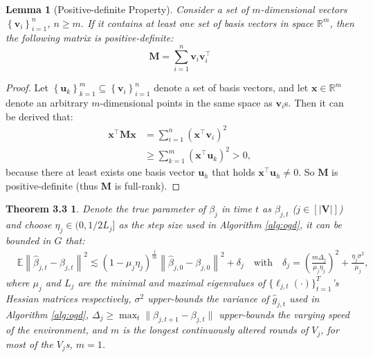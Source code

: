 \documentclass{article}
\theoremstyle{plain}
\newtheorem*{theorem*}{Theorem 3.3}
\newtheorem{lemma}[theorem]{Lemma}
\theoremstyle{definition}
\theoremstyle{remark}
\def \x {\mathbf{x}}
\def \V {\mathbf{V}}
\def \M {\mathbf{M}}
\def \V {\mathbf{V}}
\def \v {\mathbf{v}}
\def \u {\mathbf{u}}
\begin{document}
\begin{lemma}[Positive-definite Property]
  \label{lemma:basis}
  Consider a set of $m$-dimensional vectors $\left\{\v_i\right\}_{i=1}^n$, $n\geq m$. 
  If it contains at least one set of basis vectors in space $\mathbb{R}^{m}$, then the following matrix is positive-definite:
  \[
   \M =\sum_{i=1}^n  \v_i\v_i^\top
  \]
\end{lemma}
\begin{proof}
Let $\left\{\u_k\right\}_{k=1}^m \subseteq \left\{\v_i\right\}_{i=1}^n$ denote a set of basis vectors, and let $\x\in\mathbb{R}^{m}$ denote an arbitrary $m$-dimensional points in the same space as $\v_i$s. Then it can be derived that:
\[
  \begin{aligned}
    \x^\top \M\x 
    &= \sum_{i=1}^n  \left(\x^\top\v_i\right)^2\\
    &\geq \sum_{k=1}^m  \left(\x^\top\u_k\right)^2 > 0,
  \end{aligned}
\]
because there at least exists one basis vector $\u_h$ that holds $\x^\top\u_h\neq 0$. So $\M$ is positive-definite (thus $\M$ is full-rank).
\end{proof}


\begin{theorem*}
  Denote the true parameter of $\beta_j$ in time $t$ as $\beta_{j, t}$ ($j\in[|\V|]$) and choose $\eta_j\in(0, 1/2L_j]$ as the step size used in Algorithm \ref{alg:ogd}, 
  it can be bounded in $G$ that:
  \begin{equation*}
    \begin{aligned}
      &\mathbb{E}\left\|\hat{\beta}_{j, t} - \beta_{j, t}\right\|^2 \lesssim (1-\mu_j \eta_j)^{\frac{t}{m}} \left\|\hat{\beta}_{j, 0} - \beta_{j, 0}\right\|^2 + \delta_j\quad
      \text{with}\quad \delta_j = \left(\frac{m\Delta_j }{\mu_j \eta_j}\right)^2 + \frac{\eta_j\sigma^2}{\mu_j},
    \end{aligned}
  \end{equation*}
  where $\mu_j$ and $L_j$ are the minimal and maximal eigenvalues of $\{\ell_{j, t}(\cdot)\}_{t=1}^T$'s Hessian matrices respectively,
  $\sigma^2$ upper-bounds the variance of $\hat{g}_{j, t}$ used in Algorithm \ref{alg:ogd}, 
  $\Delta_j \geq \max_t \|\beta_{j,t+1} - \beta_{j, t}\|$ upper-bounds the varying speed of the environment, 
  and $m$ is the longest continuously altered rounds of $V_j$, for most of the $V_j$s, $m = 1$.
\end{theorem*}
\end{document}
